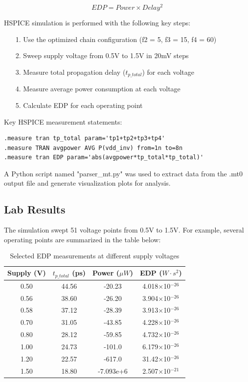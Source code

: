 \documentclass[UTF8,12pt,a4paper]{ctexart}
\begin{document}
\[EDP = Power \times Delay^2\]

HSPICE simulation is performed with the following key steps:

\begin{enumerate}
    \item[1. ] Use the optimized chain configuration (f2 = 5, f3 = 15, f4 = 60)
    \item[2. ] Sweep supply voltage from 0.5V to 1.5V in 20mV steps
    \item[3. ] Measure total propagation delay ($t_{p\_total}$) for each voltage
    \item[4. ] Measure average power consumption at each voltage
    \item[5. ] Calculate EDP for each operating point
\end{enumerate}

Key HSPICE measurement statements:

\begin{lstlisting}
.measure tran tp_total param='tp1+tp2+tp3+tp4'
.measure TRAN avgpower AVG P(vdd_inv) from=1n to=8n
.measure tran EDP param='abs(avgpower*tp_total*tp_total)'
\end{lstlisting}

A Python script named "parser\_mt.py" was used to extract data from the .mt0 output file and generate visualization plots for analysis.

\subsection{Lab Results}

The simulation swept 51 voltage points from 0.5V to 1.5V. For example, several operating points are summarized in the table below:

\begin{table}[h]
\centering
\begin{tabular}{cccc}
\toprule
\textbf{Supply (V)} & \textbf{$t_{p\_total}$ (ps)} & \textbf{Power ($\mu W$)} & \textbf{EDP ($W \cdot s^2$)} \\
\midrule
0.50 & 44.56 & -20.23 & 4.018×10$^{-26}$ \\
0.56 & 38.60 & -26.20 & 3.904×10$^{-26}$ \\
0.58 & 37.12 & -28.39 & 3.913×10$^{-26}$ \\
0.70 & 31.05 & -43.85 & 4.228×10$^{-26}$ \\
0.80 & 28.12 & -59.85 & 4.732×10$^{-26}$ \\
1.00 & 24.73 & -101.0 & 6.179×10$^{-26}$ \\
1.20 & 22.57 & -617.0 & 31.42×10$^{-26}$ \\
1.50 & 18.80 & -7.093e+6 & 2.507×10$^{-21}$ \\
\bottomrule
\end{tabular}
\caption{Selected EDP measurements at different supply voltages}
\end{table}
\end{document}
